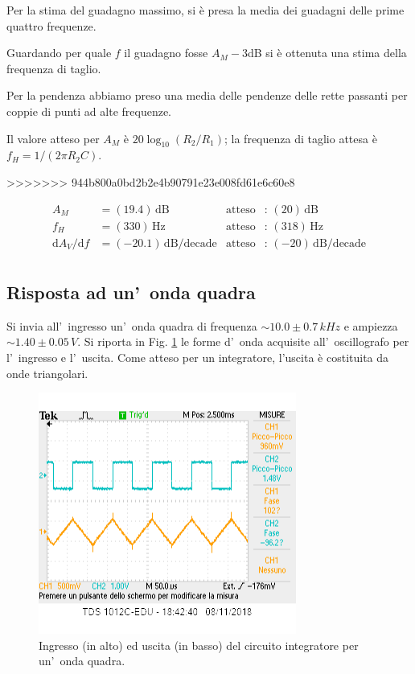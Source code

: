 \documentclass[10pt,a4paper]{article}
\begin{document}
\begin{table}[h]
\begin{figure}[h]
	\end{figure}
	 
	Per la stima del guadagno massimo, si è presa la media dei guadagni delle prime quattro frequenze.


	Guardando per quale $f$ il guadagno fosse  $A_M - 3 $dB si è ottenuta una stima della frequenza di taglio.

	Per la pendenza abbiamo preso una media delle pendenze delle rette passanti per coppie di punti ad alte frequenze.

	Il valore atteso per $A_M $ è $ 20 \log_{10}(R_2/R_1)$; la frequenza di taglio attesa è $f_H = 1/(2\pi R_2 C)$.

>>>>>>> 944b800a0bd2b2e4b90791e23e008fd61e6c60e8
	
	\begin{align*}
	A_M &= (19.4 )\,\mathrm{dB} & \mathrm{atteso} &:\,(20  )\, \mathrm{dB}  \\
	f_H &= (330 )\,\mathrm{Hz} & \mathrm{atteso} &:\,(318  )\, \mathrm{Hz} \\
	{\mathrm{d}A_V}/{\mathrm{d}f} &= (-20.1 )\,\mathrm{dB/decade} & \mathrm{atteso} &:\,(-20  )\, \mathrm{dB/decade}  \\
	\end{align*}
	
	\clearpage
	\subsection*{Risposta ad un'~onda quadra}
	Si invia all'~ingresso un'~onda quadra di frequenza $\sim 10.0\pm0.7 \,kHz$ e ampiezza $\sim 1.40\pm 0.05\,V$.
	Si riporta in Fig. \ref{fig:oscinte} le forme d'~onda acquisite all'~oscillografo per l'~ingresso
	e l'~uscita. 
	Come atteso per un integratore, l'uscita è costituita da onde triangolari.
	\begin{figure}[htb]
		\begin{center}

			\includegraphics[scale=0.8]{zanna.png}
		\end{center}
		\caption{\small Ingresso (in alto) ed uscita (in basso) del circuito integratore per un'~onda quadra.}
		\label{fig:oscinte}
	\end{figure}
	

\end{table}
\end{document}
